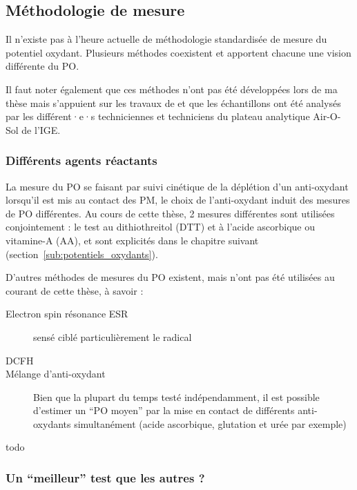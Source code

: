 \subsection{Méthodologie de mesure}%
\label{sub:methodologie_de_mesure}

Il n'existe pas à l'heure actuelle de méthodologie standardisée de mesure du potentiel
oxydant. Plusieurs méthodes coexistent et apportent chacune une vision différente du PO.

Il faut noter également que ces méthodes n'ont pas été développées lors de ma thèse mais
s'appuient sur les travaux de \cite{calasPollution2017} et que les échantillons ont été
analysés par les différent·e·s techniciennes et techniciens du plateau analytique
Air-O-Sol de l'IGE.

\subsubsection{Différents agents réactants}%
\label{ssub:differents_agent_reactant}

La mesure du PO se faisant par suivi cinétique de la déplétion d'un anti-oxydant
lorsqu'il est mis au contact des PM, le choix de l'anti-oxydant induit des mesures de PO
différentes. Au cours de cette thèse, 2 mesures différentes sont utilisées conjointement :
le test au dithiothreitol (DTT) et à l'acide ascorbique ou vitamine-A (AA), et sont
explicités dans le chapitre suivant (section~\ref{sub:potentiels_oxydants}).

D'autres méthodes de mesures du PO existent, mais n'ont pas été utilisées au courant de
cette thèse, à savoir :
\begin{description}
    \item[Electron spin résonance ESR] sensé ciblé particulièrement le radical
         \autocite{shiHydroxyl2003,shiTemporal2003}
    \item[DCFH]
    \item[Mélange d'anti-oxydant] Bien que la plupart du temps testé indépendamment, il est
        possible d'estimer un ``PO moyen'' par la mise en contact de différents
        anti-oxydants simultanément (acide ascorbique, glutation et urée par exemple)~\autocite{calasComparison2018}
    \item[todo] 
\end{description}

\subsubsection{Un ``meilleur'' test que les autres ?}%
\label{ssub:un_meilleur_test_que_les_autres_}

